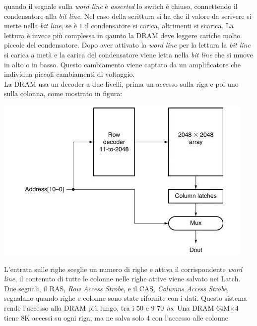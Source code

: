 \documentclass[a4paper,12pt, oneside]{book}
\begin{document}
\begin{itemize}
\begin{center}
\end{center}
quando il segnale sulla \textit{word line} è \textit{asserted} lo switch è chiuso, connettendo il condensatore alla \textit{bit line}. Nel caso della scrittura si ha che il valore da scrivere si mette nella \textit{bit line}, se è $1$ il condensatore si carica, altrimenti si scarica. La lettura è invece più complessa in qaunto la DRAM deve leggere cariche molto piccole del condensatore. Dopo aver attivato la \textit{word line} per la lettura la \textit{bit line} si carica a metà e la carica del condensatore viene letta nella \textit{bit line} che si muove in alto o in basso. Questo cambiamento viene captato da un amplificatore che individua piccoli cambiamenti di voltaggio.\\
La DRAM usa un decoder a due livelli, prima un accesso sulla riga e poi uno sulla colonna, come mostrato in figura:
\begin{center}
\includegraphics[scale=0.7]{img/dram2.png}
\end{center}
L'entrata sulle righe sceglie un numero di righe e attiva il corrispondente \textit{word line}, il contenuto di tutte le colonne nelle righe attive viene salvato nei Latch. Due segnali, il RAS, \textit{Row Access Strobe}, e il CAS, \textit{Columns Access Strobe}, segnalano quando righe e colonne sono state rifornite con i dati. Questo sistema rende l'accesso alla DRAM più lungo, tra i $50$ e 9 $70$ \textit{ns}. Una DRAM 64M$\times$4 tiene 8K accessi su ogni riga, ma ne salva solo 4 con l'accesso alle colonne
\end{itemize}
\end{document}
